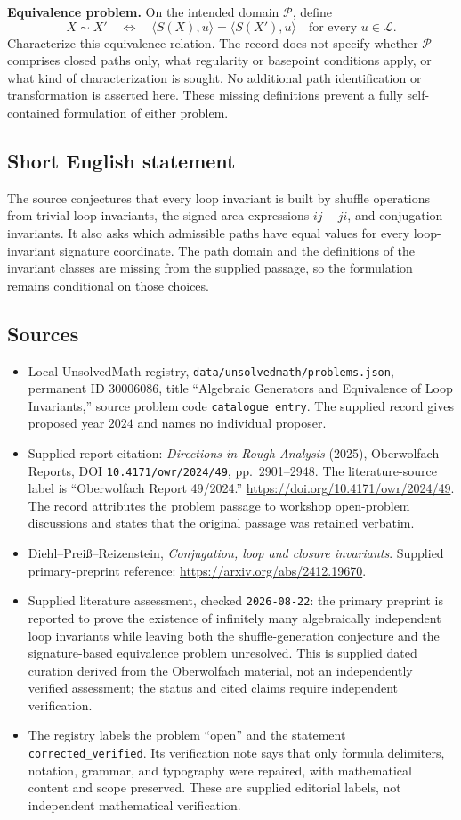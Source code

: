 \documentclass[11pt]{article}
\begin{document}
\textbf{Equivalence problem.} On the intended domain \(\mathcal P\), define
\[
X\sim X'
\quad\Longleftrightarrow\quad
\langle S(X),u\rangle=\langle S(X'),u\rangle
\quad\text{for every }u\in\mathcal L.
\]
Characterize this equivalence relation. The record does not specify whether \(\mathcal P\) comprises closed paths only, what regularity or basepoint conditions apply, or what kind of characterization is sought. No additional path identification or transformation is asserted here. These missing definitions prevent a fully self-contained formulation of either problem.
\subsection{Short English statement}
The source conjectures that every loop invariant is built by shuffle operations from trivial loop invariants, the signed-area expressions \(ij-ji\), and conjugation invariants. It also asks which admissible paths have equal values for every loop-invariant signature coordinate. The path domain and the definitions of the invariant classes are missing from the supplied passage, so the formulation remains conditional on those choices.
\subsection{Sources}
\begin{itemize}
\item Local UnsolvedMath registry, \texttt{data/unsolvedmath/problems.json}, permanent ID \(30006086\), title ``Algebraic Generators and Equivalence of Loop Invariants,'' source problem code \texttt{catalogue entry}. The supplied record gives proposed year \(2024\) and names no individual proposer.
\item Supplied report citation: \emph{Directions in Rough Analysis} (2025), Oberwolfach Reports, DOI \texttt{10.4171/owr/2024/49}, pp.\ 2901--2948. The literature-source label is ``Oberwolfach Report 49/2024.'' \url{https://doi.org/10.4171/owr/2024/49}. The record attributes the problem passage to workshop open-problem discussions and states that the original passage was retained verbatim.
\item Diehl--Preiß--Reizenstein, \emph{Conjugation, loop and closure invariants}. Supplied primary-preprint reference: \url{https://arxiv.org/abs/2412.19670}.
\item Supplied literature assessment, checked \texttt{2026-08-22}: the primary preprint is reported to prove the existence of infinitely many algebraically independent loop invariants while leaving both the shuffle-generation conjecture and the signature-based equivalence problem unresolved. This is supplied dated curation derived from the Oberwolfach material, not an independently verified assessment; the status and cited claims require independent verification.
\item The registry labels the problem ``open'' and the statement \texttt{corrected\_verified}. Its verification note says that only formula delimiters, notation, grammar, and typography were repaired, with mathematical content and scope preserved. These are supplied editorial labels, not independent mathematical verification.
\end{itemize}
\end{document}
